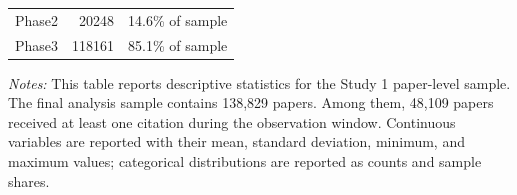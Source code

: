 \begin{table}[htbp]
\begin{tabular}{lrrrrr}
\hspace{0.4cm} Phase2 & 20248 & \multicolumn{4}{l}{14.6\% of sample} \\
\hspace{0.4cm} Phase3 & 118161 & \multicolumn{4}{l}{85.1\% of sample} \\
\bottomrule
\end{tabular}
\begin{minipage}{\linewidth}
\smallskip
\footnotesize \textit{Notes:} This table reports descriptive statistics for the Study 1 paper-level sample. The final analysis sample contains 138,829 papers. Among them, 48,109 papers received at least one citation during the observation window. Continuous variables are reported with their mean, standard deviation, minimum, and maximum values; categorical distributions are reported as counts and sample shares.
\end{minipage}
\end{table}